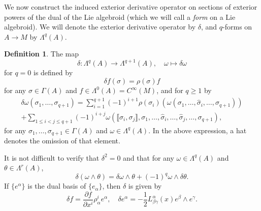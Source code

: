 \documentclass[11pt]{article}
\theoremstyle{plain}
\theoremstyle{definition}
\newtheorem{definition}{Definition}
\begin{document}
We now construct the induced exterior derivative operator on sections of exterior powers of the dual of the Lie algebroid (which we will call a \emph{form} on a Lie algebroid). We will denote the exterior derivative operator by $\delta$, and $q$-forms on $A\to M$ by $\Lambda^q(A)$.

\begin{definition}
The map
\begin{equation*}
    \delta\colon \Lambda^q(A)\longrightarrow \Lambda^{q+1}(A),\quad \omega \longmapsto \delta \omega
\end{equation*}
for $q=0$ is defined by
\begin{equation*}
    \delta f(\sigma)=\rho(\sigma) f
\end{equation*}
for any $\sigma\in \Gamma(A)$ and $f\in \Lambda^0(A)=C^{\infty}(M)$,  and for $q\geq 1$ by
\begin{multline*}
    \delta \omega(\sigma_1,\dots,\sigma_{q+1})=\sum_{i=1}^{q+1} (-1)^{i+1}\rho(\sigma_i)\left(\omega(\sigma_1,\dots,\hat{\sigma}_i,\dots,\sigma_{q+1})\right)\\+\sum_{1\leq i<j\leq q+1} (-1)^{i+j} \omega(\llbracket \sigma_i,\sigma_j\rrbracket,\sigma_1,\dots,\hat{\sigma}_i,\dots,\hat{\sigma}_j,\dots,\sigma_{q+1}),
\end{multline*}
for any $\sigma_1,\dots,\sigma_{q+1}\in \Gamma(A)$ and $\omega\in \Lambda^q(A)$. In the above expression, a hat denotes the omission of that element.
\end{definition}
It is not difficult to verify that $\delta^2=0$ and that for any $\omega\in \Lambda^q(A)$ and $\theta\in \Lambda^r(A)$,
\begin{equation*}
    \delta(\omega\wedge \theta)=\delta \omega\wedge \theta+(-1)^q \omega\wedge \delta \theta.
\end{equation*}
If $\{e^{\alpha}\}$ is the dual basis of $\{e_{\alpha}\}$, then $\delta$ is given by
\begin{equation}\label{eqn:structure}
    \delta f=\frac{\partial f}{\partial x^i}\rho_{\alpha}^i e^{\alpha},\quad \delta e^{\alpha}=-\frac{1}{2}L_{\beta \gamma}^{\alpha}(x) e^{\beta}\wedge e^{\gamma}.
\end{equation}
\end{document}
